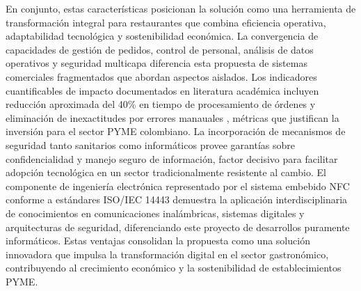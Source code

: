 En conjunto, estas características posicionan la solución como una herramienta de transformación integral para restaurantes que combina eficiencia operativa, adaptabilidad tecnológica y sostenibilidad económica. La convergencia de capacidades de gestión de pedidos, control de personal, análisis de datos operativos y seguridad multicapa diferencia esta propuesta de sistemas comerciales fragmentados que abordan aspectos aislados. Los indicadores cuantificables de impacto documentados en literatura académica incluyen reducción aproximada del 40\% en tiempo de procesamiento de órdenes y eliminación de inexactitudes por errores manauales \cite{Katagri2025}, métricas que justifican la inversión para el sector PYME colombiano. La incorporación de mecanismos de seguridad tanto sanitarios como informáticos provee garantías sobre confidencialidad y manejo seguro de información, factor decisivo para facilitar adopción tecnológica en un sector tradicionalmente resistente al cambio. El componente de ingeniería electrónica representado por el sistema embebido NFC conforme a estándares ISO/IEC 14443 \cite{Liyanage2018} demuestra la aplicación interdisciplinaria de conocimientos en comunicaciones inalámbricas, sistemas digitales y arquitecturas de seguridad, diferenciando este proyecto de desarrollos puramente informáticos. Estas ventajas consolidan la propuesta como una solución innovadora que impulsa la transformación digital en el sector gastronómico, contribuyendo al crecimiento económico y la sostenibilidad de establecimientos PYME.




